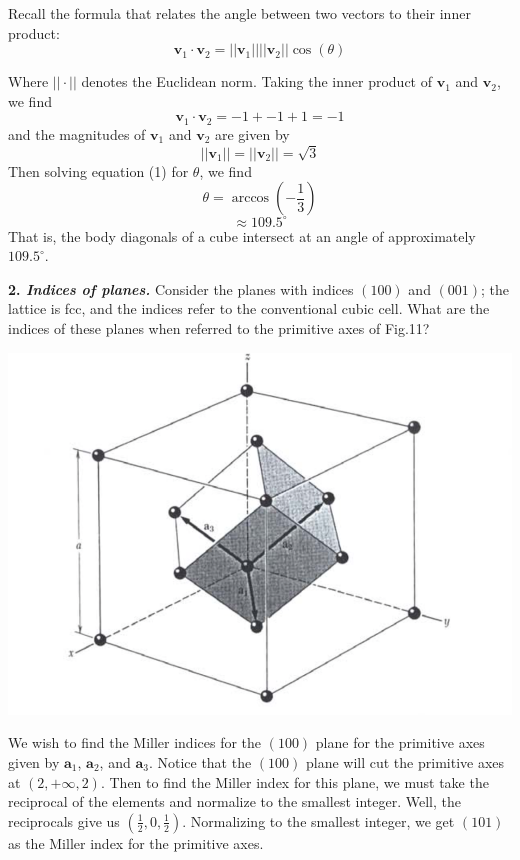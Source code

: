 \documentclass{article}
\begin{document}
Recall the formula that relates the angle between two vectors to their inner product:
\begin{equation}
    \textbf{v}_1 \cdot \textbf{v}_2 = ||\textbf{v}_1||||\textbf{v}_2||\cos{(\theta)}
\end{equation}

Where $|| \cdot ||$ denotes the Euclidean norm. Taking the inner product of $\textbf{v}_1$ and $\textbf{v}_2$, we find
\[\textbf{v}_1 \cdot \textbf{v}_2 = -1 + -1 + 1 = -1\]
and the magnitudes of $\textbf{v}_1$ and $\textbf{v}_2$ are given by
\[||\textbf{v}_1|| = ||\textbf{v}_2|| = \sqrt{3}\]
Then solving equation (1) for $\theta$, we find
\[\theta = \arccos\left(-{\frac{1}{3}}\right)\]
\[\approx 109.5^{\circ}\]
That is, the body diagonals of a cube intersect at an angle of approximately $109.5^{\circ}$.
\newline\newline

\textbf{2. \textit{Indices of planes.}} Consider the planes with indices $(100)$ and $(001)$; the lattice is fcc, and the indices refer to the conventional cubic cell. What are the indices of these planes when referred to the primitive axes of Fig.11?
\newline\newline
\begin{center}
    \includegraphics[scale = 0.6]{cubefigure.PNG}
\end{center}


We wish to find the Miller indices for the $(100)$ plane for the primitive axes given by $\textbf{a}_1$, $\textbf{a}_2$, and $\textbf{a}_3$. Notice that the $(100)$ plane will cut the primitive axes at $(2,+\infty,2)$. Then to find the Miller index for this plane, we must take the reciprocal of the elements and normalize to the smallest integer. Well, the reciprocals give us $\left(\frac{1}{2}, 0 , \frac{1}{2}\right)$. Normalizing to the smallest integer, we get $(101)$ as the Miller index for the primitive axes. 
\newline
\end{document}
